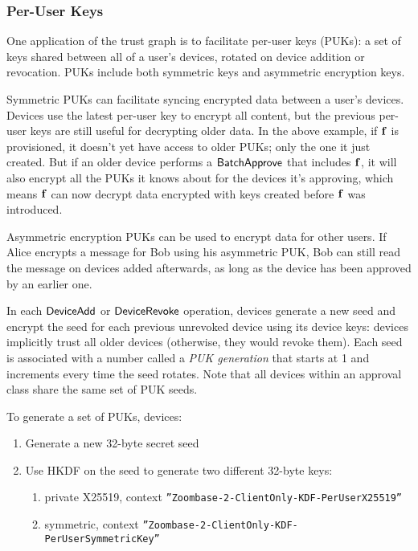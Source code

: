 \subsubsection{Per-User Keys}

One application of the trust graph is to facilitate per-user keys (PUKs): a set of keys shared
between all of a user's devices, rotated on device addition or revocation. PUKs include both symmetric keys and asymmetric encryption keys.

Symmetric PUKs can facilitate syncing encrypted data between a user's devices. Devices
use the latest per-user key to encrypt all content, but the previous per-user keys are still useful
for decrypting older data. In the above example, if $\mathbf{f}$ is provisioned, it doesn't yet have
access to older PUKs; only the one it just created. But if an older device performs a
$\mathsf{BatchApprove}{}$ that includes $\mathbf{f}$, it will also encrypt all the PUKs it knows about for the
devices it's approving, which means $\mathbf{f}$ can now decrypt data encrypted with keys created before $\mathbf{f}$ was
introduced.

Asymmetric encryption PUKs can be used to encrypt data for other users. If Alice encrypts a message for Bob using his asymmetric PUK, Bob can still read the message on devices added afterwards, as long as the device has been approved by an earlier one.

In each $\mathsf{DeviceAdd}{}$ or $\mathsf{DeviceRevoke}{}$ operation, devices generate a new seed and encrypt the
seed for each previous unrevoked device using its device keys: devices implicitly trust all older
devices (otherwise, they would revoke them). Each seed is associated with a number called a
\textit{PUK generation} that starts at 1 and increments every time the seed rotates. Note that all devices within an approval class share the same set of PUK seeds.

To generate a set of
PUKs, devices:

\begin{enumerate}
\item
Generate a new 32-byte secret seed
\item
Use HKDF on the seed to generate two different 32-byte keys:
\begin{enumerate}
\item
private X25519, context \texttt{”Zoombase-2-ClientOnly-KDF-PerUserX25519”}
\item
symmetric, context \texttt{”Zoombase-2-ClientOnly-KDF-PerUserSymmetricKey”}
\end{enumerate}
\end{enumerate}

